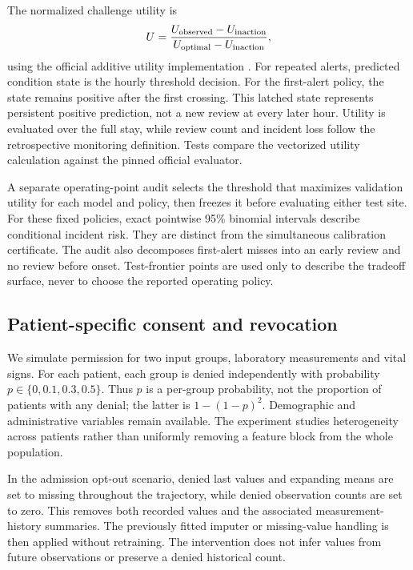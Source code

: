 The normalized challenge utility is
\begin{equation}
 U=\frac{U_{\rm observed}-U_{\rm inaction}}
 {U_{\rm optimal}-U_{\rm inaction}},
\end{equation}
using the official additive utility implementation \citep{reyna2020}. For repeated alerts, predicted condition state is the hourly threshold decision. For the first-alert policy, the state remains positive after the first crossing. This latched state represents persistent positive prediction, not a new review at every later hour. Utility is evaluated over the full stay, while review count and incident loss follow the retrospective monitoring definition. Tests compare the vectorized utility calculation against the pinned official evaluator.

A separate operating-point audit selects the threshold that maximizes validation utility for each model and policy, then freezes it before evaluating either test site. For these fixed policies, exact pointwise 95\% binomial intervals describe conditional incident risk. They are distinct from the simultaneous calibration certificate. The audit also decomposes first-alert misses into an early review and no review before onset. Test-frontier points are used only to describe the tradeoff surface, never to choose the reported operating policy.

\subsection{Patient-specific consent and revocation}
We simulate permission for two input groups, laboratory measurements and vital signs. For each patient, each group is denied independently with probability $p\in\{0,0.1,0.3,0.5\}$. Thus $p$ is a per-group probability, not the proportion of patients with any denial; the latter is $1-(1-p)^2$. Demographic and administrative variables remain available. The experiment studies heterogeneity across patients rather than uniformly removing a feature block from the whole population.

In the admission opt-out scenario, denied last values and expanding means are set to missing throughout the trajectory, while denied observation counts are set to zero. This removes both recorded values and the associated measurement-history summaries. The previously fitted imputer or missing-value handling is then applied without retraining. The intervention does not infer values from future observations or preserve a denied historical count.

